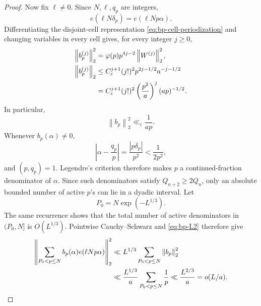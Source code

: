 \documentclass[11pt]{article}
\numberwithin{equation}{section}
\theoremstyle{definition}
\newcommand{\1}{\mathbf 1}
\newcommand{\norm}[1]{\left\lVert#1\right\rVert}
\begin{document}
\begin{proof}
Now fix \(\ell\ne0\).  Since \(N,\ell,q_p\) are integers,
\[
 e(\ell N\delta_p)=e(\ell Np\alpha).
\]
Differentiating the disjoint-cell representation
\eqref{eq:bp-cell-periodization} and changing variables in every cell
gives, for every integer \(j\ge0\),
\begin{align}
 \norm{b_p^{(j)}}_2^2
 &=\varphi(p)p^{4j-2}\norm{W^{(j)}}_2^2,\notag\\
 \norm{b_p^{(j)}}_2
 &\le C_\varepsilon^{j+1}(j!)^2
 p^{2j-1/2}a^{-j-1/2}\notag\\
 &=C_\varepsilon^{j+1}(j!)^2
 \left(\frac{p^2}{a}\right)^j(ap)^{-1/2}.
 \label{eq:bp-derivative}
\end{align}
In particular,
\begin{equation}\label{eq:bp-L2}
 \norm{b_p}_2^2\ll_\varepsilon\frac1{ap}.
\end{equation}
Whenever \(b_p(\alpha)\ne0\),
\[
 \left|\alpha-\frac{q_p}p\right|
 =\frac{|p\delta_p|}{p^2}<\frac1{2p^2},
\]
and \((p,q_p)=1\).  Legendre's criterion therefore makes \(p\) a
continued-fraction denominator of \(\alpha\).  Since such denominators
satisfy \(Q_{n+2}\ge2Q_n\), only an absolute bounded number of active
\(p\)'s can lie in a dyadic interval.  Let
\[
 P_0=N\exp(-L^{1/3}).
\]
The same recurrence shows that the total number of active denominators
in \((P_0,N]\) is \(O(L^{1/3})\).  Pointwise Cauchy--Schwarz and
\eqref{eq:bp-L2} therefore give
\begin{align}
 \left\|\sum_{P_0<p\le N}b_p(\alpha)e(\ell Np\alpha)\right\|_2^2
 &\ll L^{1/3}\sum_{P_0<p\le N}\norm{b_p}_2^2\notag\\
 &\ll\frac{L^{1/3}}a\sum_{P_0<p\le N}\frac1p
 \ll\frac{L^{2/3}}a=o(L/a).
 \label{eq:near-highp}
\end{align}


\end{proof}
\end{document}

